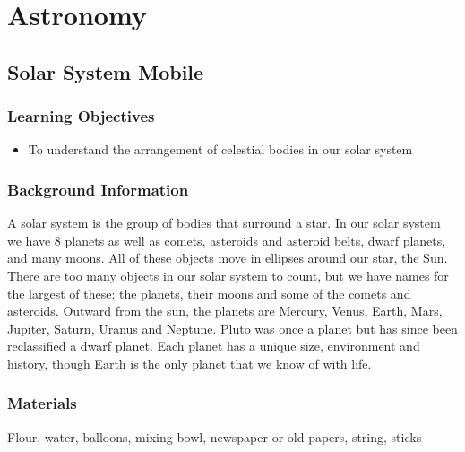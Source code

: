 \section{Astronomy}

\subsection{Solar System Mobile}

\subsubsection*{Learning Objectives}
\begin{itemize}
\item{To understand the arrangement of celestial bodies in our solar system}
\end{itemize}

\subsubsection*{Background Information}
A solar system is the group of bodies that surround a star. In our solar system we have 8 planets as well as comets, asteroids and asteroid belts, dwarf planets, and many moons. All of these objects move in ellipses around our star, the Sun. There are too many objects in our solar system to count, but we have names for the largest of these: the planets, their moons and some of the comets and asteroids. Outward from the sun, the planets are Mercury, Venus, Earth, Mars, Jupiter, Saturn, Uranus and Neptune. Pluto was once a planet but has since been reclassified a dwarf planet. Each planet has a unique size, environment and history, though Earth is the only planet that we know of with life.

\subsubsection*{Materials} Flour, water, balloons, mixing bowl, newspaper or old papers, string, sticks

